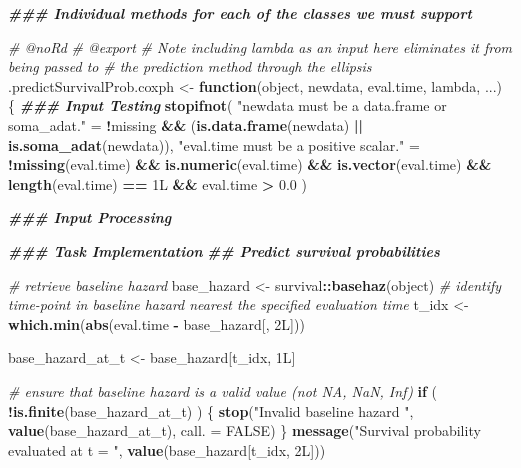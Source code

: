\documentclass[
]{book}
\newenvironment{Shaded}{\begin{snugshade}}{\end{snugshade}}
\newcommand{\AttributeTok}[1]{\textcolor[rgb]{0.13,0.29,0.53}{#1}}
\newcommand{\CommentTok}[1]{\textcolor[rgb]{0.56,0.35,0.01}{\textit{#1}}}
\newcommand{\ConstantTok}[1]{\textcolor[rgb]{0.56,0.35,0.01}{#1}}
\newcommand{\ControlFlowTok}[1]{\textcolor[rgb]{0.13,0.29,0.53}{\textbf{#1}}}
\newcommand{\DocumentationTok}[1]{\textcolor[rgb]{0.56,0.35,0.01}{\textbf{\textit{#1}}}}
\newcommand{\FloatTok}[1]{\textcolor[rgb]{0.00,0.00,0.81}{#1}}
\newcommand{\FunctionTok}[1]{\textcolor[rgb]{0.13,0.29,0.53}{\textbf{#1}}}
\newcommand{\NormalTok}[1]{#1}
\newcommand{\OtherTok}[1]{\textcolor[rgb]{0.56,0.35,0.01}{#1}}
\newcommand{\SpecialCharTok}[1]{\textcolor[rgb]{0.81,0.36,0.00}{\textbf{#1}}}
\newcommand{\StringTok}[1]{\textcolor[rgb]{0.31,0.60,0.02}{#1}}
\begin{document}
\begin{Shaded}
\begin{Highlighting}[]
\DocumentationTok{\#\#\# Individual methods for each of the classes we must support}

\CommentTok{\#\textquotesingle{} @noRd}
\CommentTok{\#\textquotesingle{} @export}
\CommentTok{\#\textquotesingle{} Note including lambda as an input here eliminates it from being passed to}
\CommentTok{\#\textquotesingle{}   the prediction method through the ellipsis}
\NormalTok{.predictSurvivalProb.coxph }\OtherTok{\textless{}{-}} \ControlFlowTok{function}\NormalTok{(object, newdata, eval.time, lambda, ...) \{}
  \DocumentationTok{\#\#\# Input Testing}
  \FunctionTok{stopifnot}\NormalTok{(}
    \StringTok{"\textasciigrave{}newdata\textasciigrave{} must be a data.frame or soma\_adat."} \OtherTok{=} 
      \SpecialCharTok{!}\NormalTok{missing }\SpecialCharTok{\&\&}\NormalTok{ (}\FunctionTok{is.data.frame}\NormalTok{(newdata) }\SpecialCharTok{||} \FunctionTok{is.soma\_adat}\NormalTok{(newdata)),}
    \StringTok{"\textasciigrave{}eval.time\textasciigrave{} must be a positive scalar."} \OtherTok{=} 
      \SpecialCharTok{!}\FunctionTok{missing}\NormalTok{(eval.time) }\SpecialCharTok{\&\&} \FunctionTok{is.numeric}\NormalTok{(eval.time) }\SpecialCharTok{\&\&} 
        \FunctionTok{is.vector}\NormalTok{(eval.time) }\SpecialCharTok{\&\&} \FunctionTok{length}\NormalTok{(eval.time) }\SpecialCharTok{==}\NormalTok{ 1L }\SpecialCharTok{\&\&}\NormalTok{ eval.time }\SpecialCharTok{\textgreater{}} \FloatTok{0.0}
\NormalTok{  )}
  
  \DocumentationTok{\#\#\# Input Processing}
  
  \DocumentationTok{\#\#\# Task Implementation}
  \DocumentationTok{\#\# Predict survival probabilities}
  
  \CommentTok{\# retrieve baseline hazard}
\NormalTok{  base\_hazard }\OtherTok{\textless{}{-}}\NormalTok{ survival}\SpecialCharTok{::}\FunctionTok{basehaz}\NormalTok{(object)}
  \CommentTok{\# identify time{-}point in baseline hazard nearest the specified evaluation time}
\NormalTok{  t\_idx       }\OtherTok{\textless{}{-}} \FunctionTok{which.min}\NormalTok{(}\FunctionTok{abs}\NormalTok{(eval.time }\SpecialCharTok{{-}}\NormalTok{ base\_hazard[, 2L]))}
  
\NormalTok{  base\_hazard\_at\_t }\OtherTok{\textless{}{-}}\NormalTok{ base\_hazard[t\_idx, 1L]}
  
  \CommentTok{\# ensure that baseline hazard is a valid value (not NA, NaN, Inf)}
  \ControlFlowTok{if}\NormalTok{ ( }\SpecialCharTok{!}\FunctionTok{is.finite}\NormalTok{(base\_hazard\_at\_t) ) \{}
    \FunctionTok{stop}\NormalTok{(}\StringTok{"Invalid baseline hazard "}\NormalTok{, }\FunctionTok{value}\NormalTok{(base\_hazard\_at\_t), }\AttributeTok{call. =} \ConstantTok{FALSE}\NormalTok{)}
\NormalTok{  \}}
  \FunctionTok{message}\NormalTok{(}\StringTok{"Survival probability evaluated at t = "}\NormalTok{, }\FunctionTok{value}\NormalTok{(base\_hazard[t\_idx, 2L]))}


\end{Highlighting}
\end{Shaded}
\end{document}
